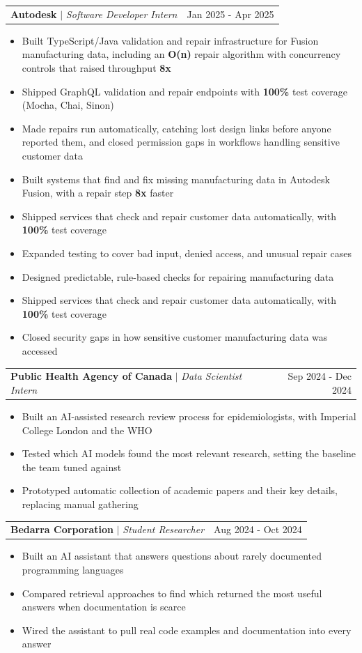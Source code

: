 \documentclass[letterpaper,10pt]{article}
\makeatletter
\newcommand{\resumeItem}[1]{
  \item\normalsize{
    {#1 \vspace{0pt}}
  }
}
\newcommand{\resumeSubheading}[3]{
    \item
    \begin{tabular*}{0.97\textwidth}[t]{l@{\extracolsep{\fill}}r}
      \textbf{#1} $|$ \textit{ #2} & #3 \\
    \end{tabular*}\vspace{-2pt}
}
\newcommand{\resumeItemListStart}{\begin{itemize}[topsep=2pt, itemsep=1pt, parsep=0pt, partopsep=0pt]}
\newcommand{\resumeItemListEnd}{\end{itemize}\vspace{0pt}}
\makeatother
\begin{document}
    \resumeSubheading{Autodesk}{Software Developer Intern}{Jan 2025 - Apr 2025}
        \resumeItemListStart
            \ifdefined\flagSWE
            \resumeItem{Built TypeScript/Java validation and repair infrastructure for Fusion manufacturing data, including an \textbf{O(n)} repair algorithm with concurrency controls that raised throughput \textbf{8x}}
            \resumeItem{Shipped GraphQL validation and repair endpoints with \textbf{100\%} test coverage (Mocha, Chai, Sinon)}
            \resumeItem{Made repairs run automatically, catching lost design links before anyone reported them, and closed permission gaps in workflows handling sensitive customer data}
            \else
            \resumeItem{Built systems that find and fix missing manufacturing data in Autodesk Fusion, with a repair step \textbf{8x} faster}
            \fi
            \ifdefined\flagSWE
            \else\ifdefined\flagQA
            \resumeItem{Shipped services that check and repair customer data automatically, with \textbf{100\%} test coverage}
            \resumeItem{Expanded testing to cover bad input, denied access, and unusual repair cases}
            \else
              \ifdefined\flagAIML
              \resumeItem{Designed predictable, rule-based checks for repairing manufacturing data}
              \fi
            \resumeItem{Shipped services that check and repair customer data automatically, with \textbf{100\%} test coverage}
              \ifdefined\flagAIML\else
              \resumeItem{Closed security gaps in how sensitive customer manufacturing data was accessed}
              \fi
            \fi\fi
        \resumeItemListEnd

    \ifdefined\flagAIML
    \resumeSubheading{Public Health Agency of Canada}{Data Scientist Intern}{Sep 2024 - Dec 2024}
        \resumeItemListStart
            \resumeItem{Built an AI-assisted research review process for epidemiologists, with Imperial College London and the WHO}
            \resumeItem{Tested which AI models found the most relevant research, setting the baseline the team tuned against}
            \resumeItem{Prototyped automatic collection of academic papers and their key details, replacing manual gathering}
        \resumeItemListEnd
    \fi

    \ifdefined\flagAIML
    \resumeSubheading{Bedarra Corporation}{Student Researcher}{Aug 2024 - Oct 2024}
        \resumeItemListStart
            \resumeItem{Built an AI assistant that answers questions about rarely documented programming languages}
            \resumeItem{Compared retrieval approaches to find which returned the most useful answers when documentation is scarce}
            \resumeItem{Wired the assistant to pull real code examples and documentation into every answer}
        \resumeItemListEnd
    \fi
\end{document}
